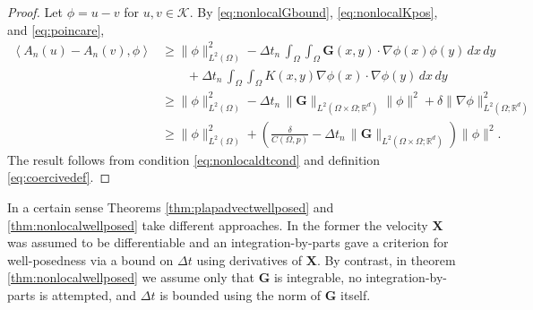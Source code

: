 \documentclass[final,leqno,onefignum,onetabnum]{siamltex1213bueler}
\newcommand\bG{\mathbf{G}}
\newcommand\bX{\mathbf{X}}
\renewcommand{\grad}{\nabla}
\newcommand{\ip}[2]{\ensuremath{\left<#1,#2\right>}}
\newcommand\RR{\mathbb{R}}
\begin{document}
\begin{proof}  Let $\phi=u-v$ for $u,v\in\mathcal{K}$.  By \eqref{eq:nonlocalGbound}, \eqref{eq:nonlocalKpos}, and \eqref{eq:poincare},
\begin{align*}
\ip{A_n(u)-A_n(v)}{\phi} &\ge \|\phi\|_{L^2(\Omega)}^2 - \Delta t_n\,\int_\Omega \int_\Omega \bG(x,y) \cdot \grad \phi(x) \phi(y)\,dx\,dy \\
    &\qquad + \Delta t_n\,\int_\Omega \int_\Omega K(x,y) \grad \phi(x) \cdot \grad \phi(y)\,dx\,dy \\
    &\ge \|\phi\|_{L^2(\Omega)}^2 - \Delta t_n\,\|\bG\|_{L^2(\Omega\times\Omega;\RR^d)} \|\phi\|^2 + \delta \|\grad\phi\|_{L^2(\Omega;\RR^d)}^2 \\
    &\ge \|\phi\|_{L^2(\Omega)}^2 + \left(\frac{\delta}{C(\Omega,p)} - \Delta t_n\,\|\bG\|_{L^2(\Omega\times\Omega;\RR^d)}\right) \|\phi\|^2.
\end{align*}
The result follows from condition \eqref{eq:nonlocaldtcond} and definition \eqref{eq:coercivedef}.
\end{proof}

In a certain sense Theorems \ref{thm:plapadvectwellposed} and \ref{thm:nonlocalwellposed} take different approaches.  In the former the velocity $\bX$ was assumed to be differentiable and an integration-by-parts gave a criterion for well-posedness via a bound on $\Delta t$ using derivatives of $\bX$.  By contrast, in theorem \ref{thm:nonlocalwellposed} we assume only that $\bG$ is integrable, no integration-by-parts is attempted, and $\Delta t$ is bounded using the norm of $\bG$ itself.
\end{document}

